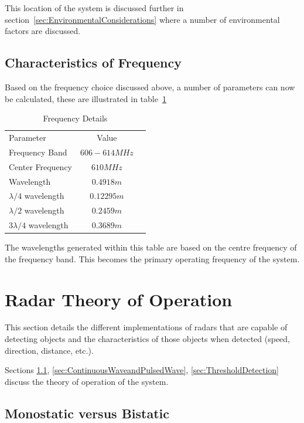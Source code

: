 \documentclass[11pt]{witseiepaper}
\begin{document}
This location of the system is discussed further in section~\ref{sec:EnvironmentalConsiderations} where a number of environmental factors are discussed.


\subsection{Characteristics of Frequency}
Based on the frequency choice discussed above, a number of parameters can now be calculated, these are illustrated in table~\ref{tab:FrequencyDetails}

\begin{table}
    \caption{Frequency Details}
    \label{tab:FrequencyDetails}
    \begin{center}
        \begin{tabular}{p{70mm}cp{70mm}}
            \hline 
            Parameter & Value \\
            Frequency Band & $606 - 614 MHz$ \\
            Center Frequency & $ 610 MHz$ \\
            Wavelength & $0.4918 m$ \\
            $\lambda /4$ wavelength & $0.12295 m$ \\
            $\lambda /2$ wavelength & $0.2459 m$ \\
            $3 \lambda /4$ wavelength & $0.3689 m$ \\                
        \end{tabular}

    \end{center}
\end{table}
The wavelengths generated within this table are based on the centre frequency of the frequency band. This becomes the primary operating frequency of the system.


\section{Radar Theory of Operation} \label{sec:ArrayStructure}
This section details the different implementations of radars that are capable of detecting objects and the characteristics of those objects when detected (speed, direction, distance, etc.).

Sections \ref{sec:MonostaticvsBistatic}, \ref{sec:ContinuousWaveandPulsedWave}, \ref{sec:ThresholdDetection} discuss the theory of operation of the system.

\subsection{Monostatic versus Bistatic} \label{sec:MonostaticvsBistatic}
\end{document}
